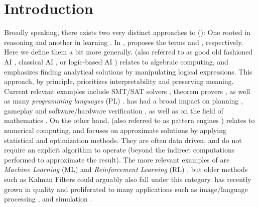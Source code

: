\chapter{Introduction} \label{Chapter:Introduction}



Broadly speaking, there exists  two very distinct approaches to \emph{\AILong{}}  (\emph{\AI{}}): One rooted in reasoning and another in learning \mcita{}.  In , \citeauthor{Platzer_2024} proposes the terms \emph{\SiAI{}} and \emph{\SuAI{}}, respectively. Here we define them a bit more generally. \SiAI{} (also referred to as good old fashioned AI \mcita{}, classical AI \mcita{},  or logic-based AI \mcita{} ) relates to algebraic computing, and emphasizes finding analytical solutions by manipulating logical expressions. This approach, by principle, prioritizes interpretability and preserving meaning. Current relevant examples include SMT/SAT solvers \mcita{}, theorem provers \mcita{},  as well as many \emph{programming languages} (PL) \mcita{}.   \SiAI{} has had a broad impact on planning \mcita{}, gameplay \mcita{} and software/hardware verification \mcita{}, as well as on the field of mathematics \mcita{}.  On the other hand, \SuAI{} (also referred to as pattern engines \mcita{})
relates to numerical computing,  and focuses on approximate solutions by applying statistical and optimization methods. They are often data driven, and do not require an explicit algorithm to operate (beyond the indirect computations performed to approximate the result). The more relevant examples of \SuAI{} are \emph{Machine Learning} (ML) \mcita{} and \emph{Reinforcement Learning} (RL) \mcita{}, but older methods such as Kalman Filters \mcita{} could arguably also fall under this category.  \SuAI{} has recently grown in quality and proliferated to many applications such as image/language processing \mcita{}, and simulation \mcita{}. 

